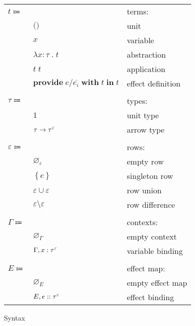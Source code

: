 \documentclass[12pt]{article}
\newcommand\anno[2]{#1 : #2}
\newcommand\term{t}
\newcommand\eUnit{\texttt{()}}
\newcommand\eVar{x}
\newcommand\eAbs[2]{\lambda #1 \; . \; #2}
\newcommand\eApp[2]{#1 \; #2}
\newcommand\eProvide[4]{\textbf{provide} \; #1 / #2 \; \textbf{with} \; #3 \; \textbf{in} \; #4}
\newcommand\type{\tau}
\newcommand\tUnit{1}
\newcommand\tArrow[2]{#1 \rightarrow #2}
\newcommand\tEmbellished[2]{{#1}^{\textcolor{violet}{#2}}}
\newcommand\row{\varepsilon}
\newcommand\rEmpty{\varnothing_{\row}}
\newcommand\rSingleton[1]{\left\{ #1 \right\}}
\newcommand\rUnion[2]{#1 \cup #2}
\newcommand\rDiff[2]{#1 \setminus #2}
\newcommand\context{\Gamma}
\newcommand\cEmpty{\varnothing_{\context}}
\newcommand\cExtend[2]{#1, #2}
\newcommand\effect{e}
\newcommand\effectMap{E}
\newcommand\emMap[2]{#1 :: #2}
\newcommand\emEmpty{\varnothing_{\effectMap}}
\newcommand\emExtend[2]{#1, #2}
\begin{document}
      \begin{figure}[H]
        \begin{mdframed}[backgroundcolor=none]
          \begin{center}
            \begin{tabular}{l l l}
              $\term \Coloneqq $ & & terms: \\
              & $\eUnit$ & unit \\
              & $\eVar$ & variable \\
              & $\eAbs{\anno{\eVar}{\type}}{\term}$ & abstraction \\
              & $\eApp{\term}{\term}$ & application \\
              & $\eProvide{\effect}{\overline{\effect_i}}{\term}{\term}$ & effect definition \\
              \\
              $\type \Coloneqq$ & & types: \\
              & $\tUnit$ & unit type \\
              & $\tArrow{\type}{\tEmbellished{\type}{\row}}$ & arrow type \\
              \\
              $\row \Coloneqq$ & & rows: \\
              & $\rEmpty$ & empty row \\
              & $\rSingleton{\effect}$ & singleton row \\
              & $\rUnion{\row}{\row}$ & row union \\
              & $\rDiff{\row}{\row}$ & row difference \\
              \\
              $\context \Coloneqq$ & & contexts: \\
              & $\cEmpty$ & empty context \\
              & $\cExtend{\context}{\anno{\eVar}{\tEmbellished{\type}{\row}}}$ & variable binding \\
              \\
              $\effectMap \Coloneqq$ & & effect map: \\
              & $\emEmpty$ & empty effect map \\
              & $\emExtend{\effectMap}{\emMap{\effect}{\tEmbellished{\type}{\row}}}$ & effect binding \\
            \end{tabular}
          \end{center}

          \caption{Syntax}\label{fig:syntax}
        \end{mdframed}
      \end{figure}
\end{document}
